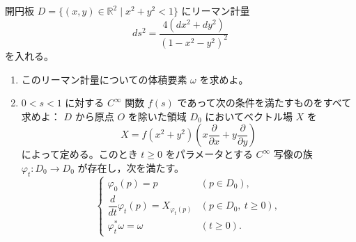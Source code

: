 \newcommand{\C}{\mathbb{C}}
\newcommand{\R}{\mathbb{R}}
\newcommand{\Z}{\mathbb{Z}}
\newcommand{\Tr}{\operatorname{Tr}}
\newcommand{\Impart}{\operatorname{Im}}
\newcommand{\AF}{\operatorname{AF}}
\newcommand{\AX}{\operatorname{AX}}
\newcommand{\GL}{\operatorname{GL}}


開円板 \(D=\{(x,y)\in\R^2\mid x^2+y^2<1\}\) にリーマン計量
\[
  ds^2=\frac{4(dx^2+dy^2)}{(1-x^2-y^2)^2}
\]
を入れる。

\begin{enumerate}
  \item このリーマン計量についての体積要素 \(\omega\) を求めよ。
  \item \(0<s<1\) に対する \(C^\infty\) 関数 \(f(s)\) であって次の条件を満たすものをすべて求めよ：
  \(D\) から原点 \(O\) を除いた領域 \(D_0\) においてベクトル場 \(X\) を
  \[
    X=f(x^2+y^2)\left(x\frac{\partial}{\partial x}+y\frac{\partial}{\partial y}\right)
  \]
  によって定める。このとき \(t\ge0\) をパラメータとする \(C^\infty\) 写像の族
  \(\varphi_t:D_0\to D_0\) が存在し，次を満たす。
  \[
  \begin{cases}
    \varphi_0(p)=p & (p\in D_0),\\
    \dfrac{d}{dt}\varphi_t(p)=X_{\varphi_t(p)} & (p\in D_0,\ t\ge0),\\
    \varphi_t^*\omega=\omega & (t\ge0).
  \end{cases}
  \]
\end{enumerate}

%